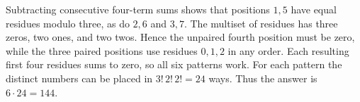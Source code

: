 Subtracting consecutive four-term sums shows that positions $1,5$ have equal residues modulo three, as do $2,6$ and $3,7$. The multiset of residues has three zeros, two ones, and two twos. Hence the unpaired fourth position must be zero, while the three paired positions use residues $0,1,2$ in any order. Each resulting first four residues sums to zero, so all six patterns work. For each pattern the distinct numbers can be placed in $3!\,2!\,2!=24$ ways. Thus the answer is $\boxed{6\cdot24=144}$.
